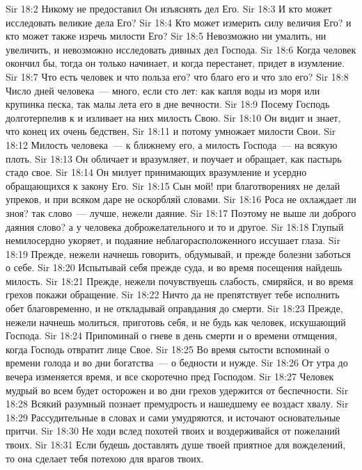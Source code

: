 \vs Sir 18:2 Никому не предоставил Он изъяснять дел Его.
\vs Sir 18:3 И кто может исследовать великие дела Его?
\vs Sir 18:4 Кто может измерить силу величия Его? и кто может также изречь милости Его?
\vs Sir 18:5 Невозможно ни умалить, ни увеличить, и невозможно исследовать дивных дел Господа.
\vs Sir 18:6 Когда человек окончил бы, тогда он только начинает, и когда перестанет, придет в изумление.
\vs Sir 18:7 Что есть человек и что польза его? что благо его и что зло его?
\vs Sir 18:8 Число дней человека~--- много, если сто лет: как капля воды из моря или крупинка песка, так малы лета его в дне вечности.
\vs Sir 18:9 Посему Господь долготерпелив к  и изливает на них милость Свою.
\vs Sir 18:10 Он видит и знает, что конец их очень бедствен,
\vs Sir 18:11 и потому умножает милости Свои.
\vs Sir 18:12 Милость человека~--- к ближнему его, а милость Господа~--- на всякую плоть.
\vs Sir 18:13 Он обличает и вразумляет, и поучает и обращает, как пастырь стадо свое.
\vs Sir 18:14 Он милует принимающих вразумление и усердно обращающихся к закону Его.
\rsbpar\vs Sir 18:15 Сын мой! при благотворениях не делай упреков, и при всяком даре не оскорбляй словами.
\vs Sir 18:16 Роса не охлаждает ли зноя? так слово~--- лучше, нежели даяние.
\vs Sir 18:17 Поэтому не выше ли доброго даяния слово? а у человека доброжелательного и то и другое.
\vs Sir 18:18 Глупый немилосердно укоряет, и подаяние неблагорасположенного иссушает глаза.
\vs Sir 18:19 Прежде, нежели начнешь говорить, обдумывай, и прежде болезни заботься о себе.
\vs Sir 18:20 Испытывай себя прежде суда, и во время посещения найдешь милость.
\vs Sir 18:21 Прежде, нежели почувствуешь слабость, смиряйся, и во время грехов покажи обращение.
\vs Sir 18:22 Ничто да не препятствует тебе исполнить обет благовременно, и не откладывай оправдания до смерти.
\vs Sir 18:23 Прежде, нежели начнешь молиться, приготовь себя, и не будь как человек, искушающий Господа.
\vs Sir 18:24 Припоминай о гневе в день смерти и о времени отмщения, когда Господь отвратит лице Свое.
\vs Sir 18:25 Во время сытости вспоминай о времени голода и во дни богатства~--- о бедности и нужде.
\vs Sir 18:26 От утра до вечера изменяется время, и все скоротечно пред Господом.
\vs Sir 18:27 Человек мудрый во всем будет осторожен и во дни грехов удержится от беспечности.
\vs Sir 18:28 Всякий разумный познает премудрость и нашедшему ее воздаст хвалу.
\vs Sir 18:29 Рассудительные в словах и сами умудряются, и источают основательные притчи.
\rsbpar\vs Sir 18:30 Не ходи вслед похотей твоих и воздерживайся от пожеланий твоих.
\vs Sir 18:31 Если будешь доставлять душе твоей приятное для вожделений, то она сделает тебя потехою для врагов твоих.
